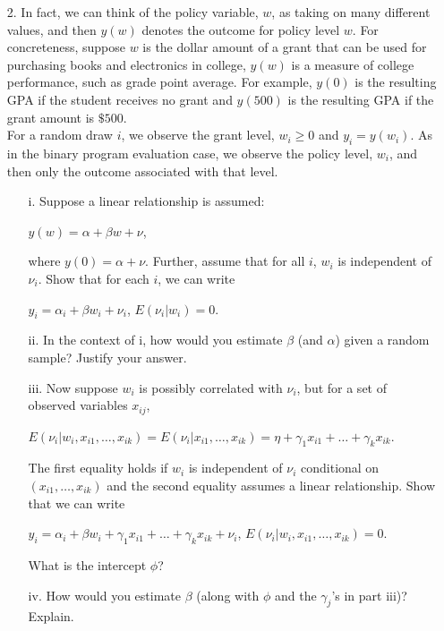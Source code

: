 \documentclass{article}
\begin{document}
\begin{enumerate}
    \item[2.] In fact, we can think of the policy variable, \(w\), as taking on many different values, and then \(y(w)\) denotes the outcome for policy level \(w\). For concreteness, suppose \(w\) is the dollar amount of a grant that can be used for purchasing books and electronics in college, \(y(w)\) is a measure of college performance, such as grade point average. For example, \(y(0)\) is the resulting GPA if the student receives no grant and \(y(500)\) is the resulting GPA if the grant amount is \(\$500\).\\
    For a random draw \(i\), we observe the grant level, \(w_{i} \geq0\) and \(y_{i}=y(w_{i})\). As in the binary program evaluation case, we observe the policy level, \(w_{i}\), and then only the outcome associated with that level.
    \begin{itemize}
        \item[i.] Suppose a linear relationship is assumed:
            \begin{center}
                \(y(w)=\alpha+\beta w+\nu\),
            \end{center}
        where \(y(0)=\alpha+\nu\). Further, assume that for all \(i\), \(w_{i}\) is independent of \(\nu_{i}\). Show that for each \(i\), we can write
        \begin{center}
            \(y_{i}=\alpha_{i}+\beta w_{i}+\nu_{i}\), \(E(\nu_{i} | w_{i}) = 0\).
        \end{center}
        \item[ii.] In the context of i, how would you estimate \(\beta\) (and \(\alpha\)) given a random sample? Justify your answer.
        \item[iii.] Now suppose \(w_{i}\) is possibly correlated with \(\nu_{i}\), but for a set of observed variables \(x_{i j}\),
        \begin{center}
            \(E(\nu_{i} | w_{i}, x_{i 1}, \ldots, x_{i k})=E(\nu_{i} | x_{i 1}, \ldots, x_{i k})=\eta+\gamma_{1}x_{i 1}+\ldots+\gamma_{k}x_{i k}\).
        \end{center}
         The first equality holds if \(w_{i}\) is independent of \(\nu_{i}\) conditional on \((x_{i 1}, \ldots, x_{i k})\) and the second equality assumes a linear relationship. Show that we can write 
         \begin{center}
            \(y_{i}=\alpha_{i}+\beta w_{i}+\gamma_{1}x_{i 1}+\ldots+\gamma_{k}x_{i k}+\nu_{i}\), \(E(\nu_{i} | w_{i}, x_{i 1}, \ldots, x_{i k}) = 0\).
         \end{center}
         What is the intercept \(\phi\)?
        \item[iv.] How would you estimate \(\beta\) (along with \(\phi\) and the \(\gamma_{j}\)’s in part iii)? Explain.
    \end{itemize}











\end{enumerate}
\end{document}

